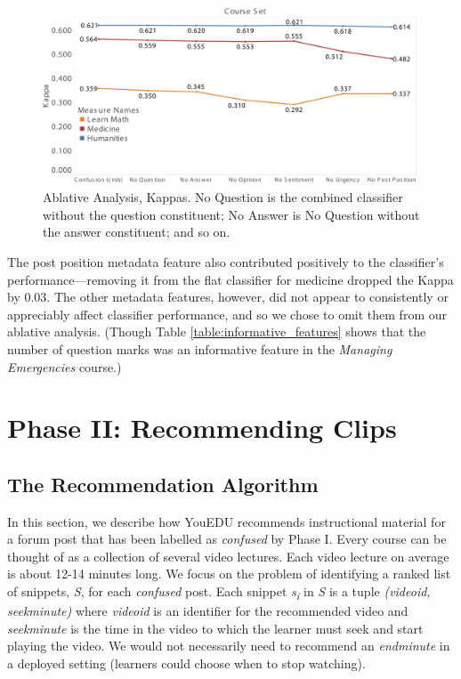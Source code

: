 \documentclass{edm_template}
\begin{document}
\begin{figure}[htp]
       \centering
       \includegraphics[width=1.0\textwidth]{../Figs/ablativeAnalysisCropped.png}
       \caption{\textnormal{Ablative Analysis, Kappas. No Question
           is the combined classifier without the question
           constituent; No Answer is No Question without the
           answer constituent; and so on.}}
       \label{fig:ablative}
\end{figure}

The post position metadata feature also contributed positively to the classifier's performance---removing it from the flat classifier for medicine dropped the Kappa by 0.03. The other metadata features, however, did not appear to consistently or appreciably affect classifier performance, and so we chose to omit them from our ablative analysis. (Though Table \ref{table:informative_features} shows that the number of question marks was  an informative feature in the \emph{Managing Emergencies} course.)

\section{Phase II: Recommending Clips}
\label{sec:clipRecommendation}
\vspace{1mm}
\subsection{The Recommendation Algorithm}
\vspace{1mm}
In this section, we describe how YouEDU recommends instructional material for a forum post that
has been labelled as \textit{confused} by Phase I. Every course can be thought of as a collection of several video lectures. Each video lecture on average is about 12-14 minutes long. We focus on the problem of identifying a ranked list of snippets, \textit{S}, for each \textit{confused} post. Each snippet \textit{s\textsubscript i} in \textit{S} is a tuple \textit{(video\textunderscore id, seek\textunderscore minute)} where \textit{video\textunderscore id} is an identifier for the recommended video and \textit{seek\textunderscore minute} is the time in the video to which the learner must seek and start playing the video. We would not necessarily need to recommend an \textit{end\textunderscore minute} in a deployed setting (learners could choose when to stop watching).
\end{document}
